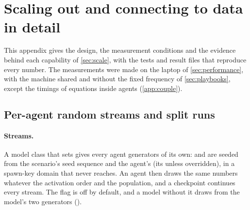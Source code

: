\section{Scaling out and connecting to data in detail}
\label{app:scale}

This appendix gives the design, the measurement conditions and the evidence behind each
capability of \cref{sec:scale}, with the tests and result files that reproduce every number. The measurements were made on the
laptop of \cref{sec:performance}, with the machine shared and without the fixed frequency of
\cref{sec:playbooks}, except the timings of equations inside agents (\cref{app:couple}).

\subsection{Per-agent random streams and split runs}
\label{app:split}

\paragraph{Streams.} A model class that sets  gives every agent
generators of its own:  and  are seeded from the
scenario's seed sequence and the agent's  (its  unless
overridden), in a spawn-key domain that  never reaches. An agent
then draws the same numbers whatever the activation order and the population, and a
checkpoint continues every stream. The flag is off by default, and a model without it draws
from the model's two generators ().

